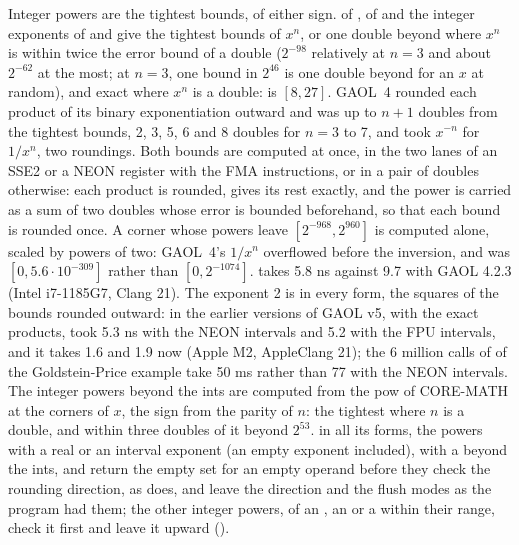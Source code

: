 \medskip
Integer powers are the tightest bounds, of either sign.\newinvfive{}
 of ,  of 
and the integer exponents of  and  give the
tightest bounds of $x^n$, or one double beyond where $x^n$ is within twice
the error bound of a double ($2^{-98}$ relatively at $n = 3$ and about
$2^{-62}$ at the most; at $n = 3$, one bound in $2^{46}$ is one double beyond
for an $x$ at random), and exact where $x^n$ is a double:  is $[8, 27]$. GAOL~4 rounded each product of its binary exponentiation
outward and was up to $n + 1$ doubles from the tightest bounds, 2, 3, 5, 6
and 8 doubles for $n = 3$ to 7, and took $x^{-n}$ for $1/x^n$, two roundings.
Both bounds are computed at once, in the two lanes of an SSE2 or a NEON
register with the FMA instructions, or in a pair of doubles otherwise: each
product is rounded,  gives its rest exactly, and the power is
carried as a sum of two doubles whose error is bounded beforehand, so that
each bound is rounded once. A corner whose powers leave
$[2^{-968}, 2^{960}]$ is computed alone, scaled by powers of two: GAOL~4's
$1/x^n$ overflowed before the inversion, and  was
$[0, 5.6 \cdot 10^{-309}]$ rather than $[0, 2^{-1074}]$. 
takes 5.8 ns against 9.7 with GAOL 4.2.3 (Intel i7-1185G7, Clang 21). The
exponent 2 is  in every form, the squares of the bounds rounded
outward: in the earlier versions of GAOL v5, with the exact products,
 took 5.3 ns with the NEON intervals and 5.2 with the FPU intervals, and it takes 1.6 and 1.9 now (Apple
M2, AppleClang 21); the 6 million calls of  of the
Goldstein-Price example take 50 ms rather than 77 with the NEON intervals.
The integer powers beyond the ints are computed from the pow of CORE-MATH at
the corners of $x$, the sign from the parity of $n$: the tightest where $n$
is a double, and within three doubles of it beyond $2^{53}$.  in all its
forms, the powers with a real or an interval exponent (an empty exponent
included), with a  beyond the  ints, and
 return the empty set for an empty
operand before they check the rounding direction, as  does, and leave
the direction and the flush modes as the program had them; the other integer
powers, of an , an  or a  within their
range, check it first and leave it upward ().

